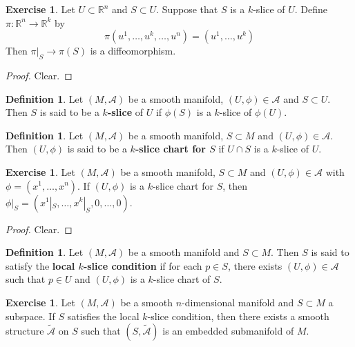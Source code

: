 \documentclass[12pt]{amsart}
\theoremstyle{definition}
\newtheorem{defn}[definition]{Definition}
\newtheorem{ex}[definition]{Exercise}
\newcommand{\R}{\mathbb{R}}
\newcommand{\MA}{\mathcal{A}}
\newcommand{\tMA}{\tilde{\MA}}
\begin{document}
	\begin{ex}
	Let $U \subset \R^n$ and $S \subset U$. Suppose that $S$ is a $k$-slice of $U$. Define $\pi: \R^n \rightarrow \R^k$ by $$\pi(u^1, \dots, u^k, \dots, u^n) = (u^1, \dots, u^k)$$ Then $\pi|_{S} \rightarrow \pi(S)$ is a diffeomorphism.
	\end{ex}	
	
	\begin{proof}
	Clear.
	\end{proof}
	
	\begin{defn}
	Let $(M, \MA)$ be a smooth manifold, $(U, \phi) \in \MA$ and $S \subset U$. Then $S$ is said to be a \textbf{$k$-slice} of $U$ if $\phi(S)$ is a $k$-slice of $\phi(U)$.
	\end{defn}	
	
	\begin{defn}
	Let $(M, \MA)$ be a smooth manifold, $S \subset M$ and $(U, \phi) \in \MA$. Then $(U, \phi)$ is said to be a \textbf{$k$-slice chart for $S$} if $U \cap S$ is a $k$-slice of $U$.
	\end{defn}	
	
	\begin{ex}
	Let $(M, \MA)$ be a smooth manifold, $S \subset M$ and $(U, \phi) \in \MA$ with $\phi = (x^1, \dots, x^n)$. If $(U, \phi)$ is a $k$-slice chart for $S$, then $\phi|_S = (x^1|_S, \dots, x^k|_S, 0, \dots, 0)$.
	\end{ex}
	
	\begin{proof}
	Clear. 
	\end{proof}
	
	\begin{defn}
	Let $(M, \MA)$ be a smooth manifold and $S \subset M$. Then $S$ is said to satisfy the \textbf{local $k$-slice condition} if for each $p \in S$, there exists $(U, \phi) \in \MA$ such that $p \in U$ and $(U, \phi)$ is a $k$-slice chart of $S$.
	\end{defn}
	
	\begin{ex}
	Let $(M, \MA)$ be a smooth $n$-dimensional manifold and $S \subset M$ a subspace. If $S$ satisfies the local $k$-slice condition, then there exists a smooth structure $\tMA$ on $S$ such that $(S, \tMA)$ is an embedded submanifold of $M$.
	\end{ex}	
	
\end{document}
